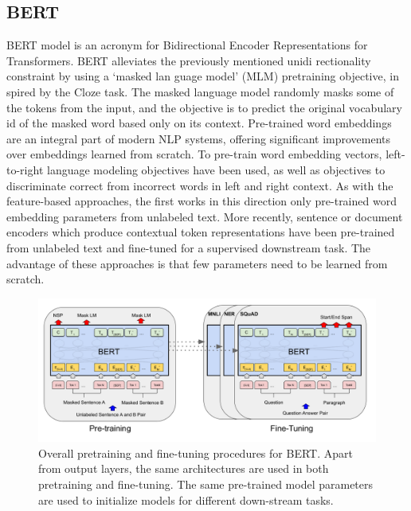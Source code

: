 \subsection{BERT}

BERT model is an acronym for Bidirectional Encoder Representations for Transformers. BERT alleviates the previously mentioned unidi rectionality constraint by using a `masked lan guage model' (MLM) pretraining objective, in spired by the Cloze task\cite{Taylor_1953}. The masked language model randomly masks some of the tokens from the input, and the objective is to predict the original vocabulary id of the masked word based only on its context. Pre-trained word embeddings are an integral part of modern NLP systems, offering significant improvements over embeddings learned from scratch\cite{Turian_2010}. To pre-train word embedding vectors, left-to-right language modeling objectives have been used\cite{Mnih_2008}, as well as objectives to discriminate correct from incorrect words in left and right context\cite{Mikolov_2014}. As with the feature-based approaches, the first works in this direction only pre-trained word embedding parameters from unlabeled text\cite{Collobert_2008}. More recently, sentence or document encoders which produce contextual token representations have been pre-trained from unlabeled text and fine-tuned for a supervised downstream task. The advantage of these approaches is that few parameters need to be learned from scratch.

\begin{figure}[H]
    \centering
    \includegraphics[width=13cm]{Graphics/bert.png}
    \caption{Overall pretraining and fine-tuning procedures for BERT. Apart from output layers, the same architectures are used in both pretraining and fine-tuning. The same pre-trained model parameters are used to initialize models for different down-stream tasks.\cite{Devlin_2018}}
    \label{fig:bert}
\end{figure}

